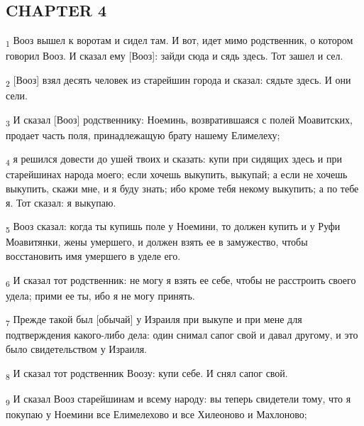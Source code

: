 \subsection{CHAPTER 4}
\begin{tcolorbox}
\textsubscript{1} Вооз вышел к воротам и сидел там. И вот, идет мимо родственник, о котором говорил Вооз. И сказал ему [Вооз]: зайди сюда и сядь здесь. Тот зашел и сел.
\end{tcolorbox}
\begin{tcolorbox}
\textsubscript{2} [Вооз] взял десять человек из старейшин города и сказал: сядьте здесь. И они сели.
\end{tcolorbox}
\begin{tcolorbox}
\textsubscript{3} И сказал [Вооз] родственнику: Ноеминь, возвратившаяся с полей Моавитских, продает часть поля, принадлежащую брату нашему Елимелеху;
\end{tcolorbox}
\begin{tcolorbox}
\textsubscript{4} я решился довести до ушей твоих и сказать: купи при сидящих здесь и при старейшинах народа моего; если хочешь выкупить, выкупай; а если не хочешь выкупить, скажи мне, и я буду знать; ибо кроме тебя некому выкупить; а по тебе я. Тот сказал: я выкупаю.
\end{tcolorbox}
\begin{tcolorbox}
\textsubscript{5} Вооз сказал: когда ты купишь поле у Ноемини, то должен купить и у Руфи Моавитянки, жены умершего, и должен взять ее в замужество, чтобы восстановить имя умершего в уделе его.
\end{tcolorbox}
\begin{tcolorbox}
\textsubscript{6} И сказал тот родственник: не могу я взять ее себе, чтобы не расстроить своего удела; прими ее ты, ибо я не могу принять.
\end{tcolorbox}
\begin{tcolorbox}
\textsubscript{7} Прежде такой был [обычай] у Израиля при выкупе и при мене для подтверждения какого-либо дела: один снимал сапог свой и давал другому, и это было свидетельством у Израиля.
\end{tcolorbox}
\begin{tcolorbox}
\textsubscript{8} И сказал тот родственник Воозу: купи себе. И снял сапог свой.
\end{tcolorbox}
\begin{tcolorbox}
\textsubscript{9} И сказал Вооз старейшинам и всему народу: вы теперь свидетели тому, что я покупаю у Ноемини все Елимелехово и все Хилеоново и Махлоново;
\end{tcolorbox}
